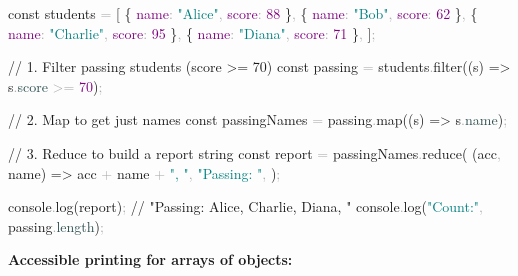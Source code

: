 \documentclass[
  justified,
  openright,
]{tufte-book}
\newcommand{\AttributeTok}[1]{\textcolor{DarkSlateGray}{#1}}
\newcommand{\BuiltInTok}[1]{#1}
\newcommand{\CommentTok}[1]{\textcolor{MidGray}{#1}}
\newcommand{\DataTypeTok}[1]{\textcolor{Purple}{#1}}
\newcommand{\DecValTok}[1]{\textcolor{Purple}{#1}}
\newcommand{\FunctionTok}[1]{\textcolor{BrandBlue}{#1}}
\newcommand{\KeywordTok}[1]{\textcolor{BrandBlue}{#1}}
\newcommand{\NormalTok}[1]{#1}
\newcommand{\OperatorTok}[1]{\textcolor{DarkGray}{#1}}
\newcommand{\StringTok}[1]{\textcolor{Teal}{#1}}
\newenvironment{Shaded}{%
  \begin{snugshade}
}{%
  \end{snugshade}
}
\begin{document}
\begin{Shaded}
\begin{Highlighting}[]
\KeywordTok{const}\NormalTok{ students }\OperatorTok{=}\NormalTok{ [}
\NormalTok{  \{ }\DataTypeTok{name}\OperatorTok{:} \StringTok{"Alice"}\OperatorTok{,} \DataTypeTok{score}\OperatorTok{:} \DecValTok{88}\NormalTok{ \}}\OperatorTok{,}
\NormalTok{  \{ }\DataTypeTok{name}\OperatorTok{:} \StringTok{"Bob"}\OperatorTok{,} \DataTypeTok{score}\OperatorTok{:} \DecValTok{62}\NormalTok{ \}}\OperatorTok{,}
\NormalTok{  \{ }\DataTypeTok{name}\OperatorTok{:} \StringTok{"Charlie"}\OperatorTok{,} \DataTypeTok{score}\OperatorTok{:} \DecValTok{95}\NormalTok{ \}}\OperatorTok{,}
\NormalTok{  \{ }\DataTypeTok{name}\OperatorTok{:} \StringTok{"Diana"}\OperatorTok{,} \DataTypeTok{score}\OperatorTok{:} \DecValTok{71}\NormalTok{ \}}\OperatorTok{,}
\NormalTok{]}\OperatorTok{;}

\CommentTok{// 1. Filter passing students (score \textgreater{}= 70)}
\KeywordTok{const}\NormalTok{ passing }\OperatorTok{=}\NormalTok{ students}\OperatorTok{.}\FunctionTok{filter}\NormalTok{((s) }\KeywordTok{=\textgreater{}}\NormalTok{ s}\OperatorTok{.}\AttributeTok{score} \OperatorTok{\textgreater{}=} \DecValTok{70}\NormalTok{)}\OperatorTok{;}

\CommentTok{// 2. Map to get just names}
\KeywordTok{const}\NormalTok{ passingNames }\OperatorTok{=}\NormalTok{ passing}\OperatorTok{.}\FunctionTok{map}\NormalTok{((s) }\KeywordTok{=\textgreater{}}\NormalTok{ s}\OperatorTok{.}\AttributeTok{name}\NormalTok{)}\OperatorTok{;}

\CommentTok{// 3. Reduce to build a report string}
\KeywordTok{const}\NormalTok{ report }\OperatorTok{=}\NormalTok{ passingNames}\OperatorTok{.}\FunctionTok{reduce}\NormalTok{(}
\NormalTok{  (acc}\OperatorTok{,}\NormalTok{ name) }\KeywordTok{=\textgreater{}}\NormalTok{ acc }\OperatorTok{+}\NormalTok{ name }\OperatorTok{+} \StringTok{", "}\OperatorTok{,}
  \StringTok{"Passing: "}\OperatorTok{,}
\NormalTok{)}\OperatorTok{;}

\BuiltInTok{console}\OperatorTok{.}\FunctionTok{log}\NormalTok{(report)}\OperatorTok{;} \CommentTok{// "Passing: Alice, Charlie, Diana, "}
\BuiltInTok{console}\OperatorTok{.}\FunctionTok{log}\NormalTok{(}\StringTok{"Count:"}\OperatorTok{,}\NormalTok{ passing}\OperatorTok{.}\AttributeTok{length}\NormalTok{)}\OperatorTok{;}
\end{Highlighting}
\end{Shaded}

\textbf{Accessible printing for arrays of objects:}
\end{document}
